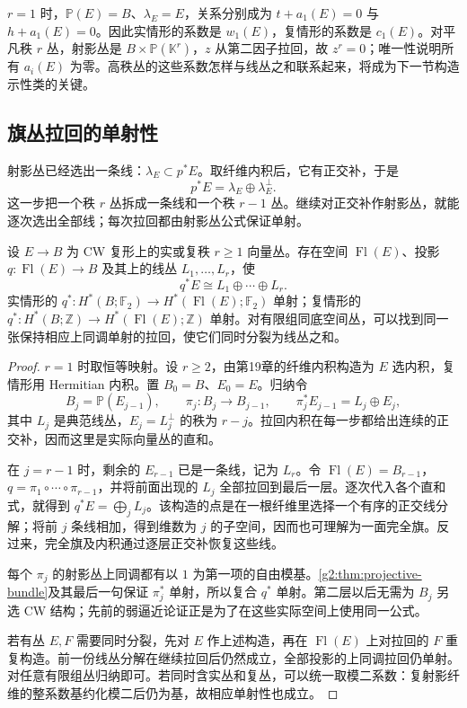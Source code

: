 \(r=1\) 时，\(\mathbb P(E)=B\)、\(\lambda_E=E\)，关系分别成为 \(t+a_1(E)=0\) 与 \(h+a_1(E)=0\)。因此实情形的系数是 \(w_1(E)\)，复情形的系数是 \(c_1(E)\)。对平凡秩 \(r\) 丛，射影丛是 \(B\times\mathbb P(\mathbb K^r)\)，\(z\) 从第二因子拉回，故 \(z^r=0\)；唯一性说明所有 \(a_i(E)\) 为零。高秩丛的这些系数怎样与线丛之和联系起来，将成为下一节构造示性类的关键。

\subsection{旗丛拉回的单射性}
\label{g2:subsec:2102:03}
射影丛已经选出一条线：\(\lambda_E\subset p^*E\)。取纤维内积后，它有正交补，于是
\[
	p^*E=\lambda_E\oplus\lambda_E^\perp.
\]
这一步把一个秩 \(r\) 丛拆成一条线和一个秩 \(r-1\) 丛。继续对正交补作射影丛，就能逐次选出全部线；每次拉回都由射影丛公式保证单射。

\begin{theorem}[分裂原理]\label{g2:thm:splitting-principle}
	设 \(E\to B\) 为 CW 复形上的实或复秩 \(r\ge1\) 向量丛。存在空间 \(\operatorname{Fl}(E)\)、投影 \(q:\operatorname{Fl}(E)\to B\) 及其上的线丛 \(L_1,\ldots,L_r\)，使
	\[
		q^*E\cong L_1\oplus\cdots\oplus L_r.
	\]
	实情形的 \(q^*:H^*(B;\mathbb F_2)\to H^*(\operatorname{Fl}(E);\mathbb F_2)\) 单射；复情形的 \(q^*:H^*(B;\mathbb Z)\to H^*(\operatorname{Fl}(E);\mathbb Z)\) 单射。对有限组同底空间丛，可以找到同一张保持相应上同调单射的拉回，使它们同时分裂为线丛之和。
\end{theorem}
\begin{proof}
	\(r=1\) 时取恒等映射。设 \(r\ge2\)，由第19章的纤维内积构造为 \(E\) 选内积，复情形用 Hermitian 内积。置 \(B_0=B\)、\(E_0=E\)。归纳令
	\[
		B_j=\mathbb P(E_{j-1}),\qquad \pi_j:B_j\to B_{j-1},\qquad
		\pi_j^*E_{j-1}=L_j\oplus E_j,
	\]
	其中 \(L_j\) 是典范线丛，\(E_j=L_j^\perp\) 的秩为 \(r-j\)。拉回内积在每一步都给出连续的正交补，因而这里是实际向量丛的直和。

	在 \(j=r-1\) 时，剩余的 \(E_{r-1}\) 已是一条线，记为 \(L_r\)。令 \(\operatorname{Fl}(E)=B_{r-1}\)，\(q=\pi_1\circ\cdots\circ\pi_{r-1}\)，并将前面出现的 \(L_j\) 全部拉回到最后一层。逐次代入各个直和式，就得到 \(q^*E=\bigoplus_jL_j\)。该构造的点是在一根纤维里选择一个有序的正交线分解；将前 \(j\) 条线相加，得到维数为 \(j\) 的子空间，因而也可理解为一面完全旗。反过来，完全旗及内积通过逐层正交补恢复这些线。

	每个 \(\pi_j\) 的射影丛上同调都有以 \(1\) 为第一项的自由模基。\cref{g2:thm:projective-bundle}及其最后一句保证 \(\pi_j^*\) 单射，所以复合 \(q^*\) 单射。第二层以后无需为 \(B_j\) 另选 CW 结构；先前的弱逼近论证正是为了在这些实际空间上使用同一公式。

	若有丛 \(E,F\) 需要同时分裂，先对 \(E\) 作上述构造，再在 \(\operatorname{Fl}(E)\) 上对拉回的 \(F\) 重复构造。前一份线丛分解在继续拉回后仍然成立，全部投影的上同调拉回仍单射。对任意有限组丛归纳即可。若同时含实丛和复丛，可以统一取模二系数：复射影纤维的整系数基约化模二后仍为基，故相应单射性也成立。
\end{proof}

